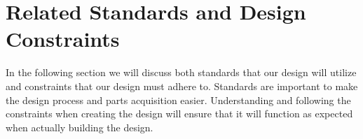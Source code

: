 
\section{Related Standards and Design Constraints}
In the following section we will discuss both standards that our design will utilize and constraints that our design must adhere to. Standards are important to make the design process and parts acquisition easier. Understanding and following the constraints when creating the design will ensure that it will function as expected when actually building the design.


